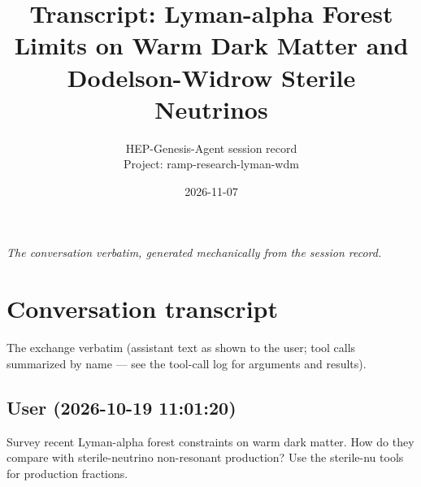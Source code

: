 \documentclass[11pt,a4paper]{article}
\title{Transcript: Lyman-alpha Forest Limits on Warm Dark Matter and Dodelson-Widrow Sterile Neutrinos}
\author{HEP-Genesis-Agent session record \\ \small Project: ramp-research-lyman-wdm}
\date{2026-11-07}
\begin{document}
\maketitle
\noindent\textit{\small The conversation verbatim, generated mechanically from the session record.}
\vspace{1em}



\appendix
\section{Conversation transcript}
\label{app:transcript}
The exchange verbatim (assistant text as shown to the user; tool calls summarized by name --- see the tool-call log for arguments and results).
\subsection*{User \small(2026-10-19 11:01:20)}
Survey recent Lyman-alpha forest constraints on warm dark matter. How do they compare with sterile-neutrino non-resonant production? Use the sterile-nu tools for production fractions.
\end{document}
